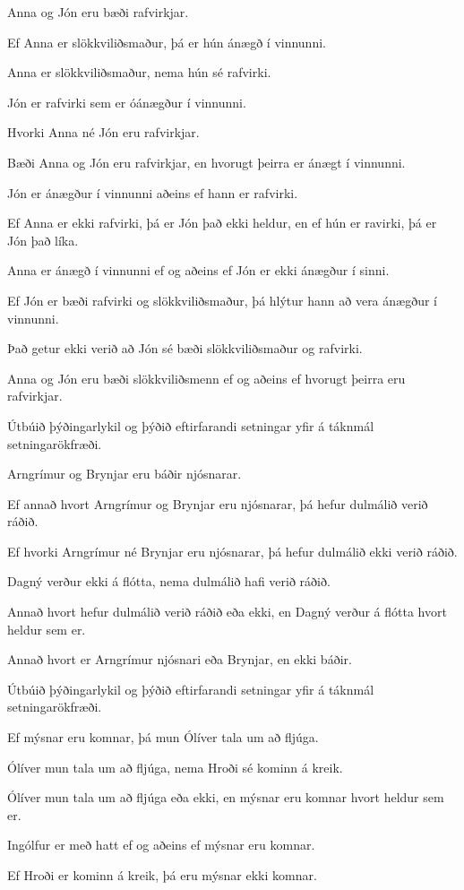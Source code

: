 \begin{earg}
\item Anna og Jón eru bæði rafvirkjar.
\item Ef Anna er slökkviliðsmaður, þá er hún ánægð í vinnunni.
\item Anna er slökkviliðsmaður, nema hún sé rafvirki.
\item Jón er rafvirki sem er óánægður í vinnunni.
\item Hvorki Anna né Jón eru rafvirkjar.
\item Bæði Anna og Jón eru rafvirkjar, en hvorugt þeirra er ánægt í vinnunni.
\item Jón er ánægður í vinnunni aðeins ef hann er rafvirki.
\item Ef Anna er ekki rafvirki, þá er Jón það ekki heldur, en ef hún er ravirki, þá er Jón það líka.
\item Anna er ánægð í vinnunni ef og aðeins ef Jón er ekki ánægður í sinni.
\item Ef Jón er bæði rafvirki og slökkviliðsmaður, þá hlýtur hann að vera ánægður í vinnunni.
\item Það getur ekki verið að Jón sé bæði slökkviliðsmaður og rafvirki.
\item Anna og Jón eru bæði slökkviliðsmenn ef og aðeins ef hvorugt þeirra eru rafvirkjar.
\end{earg}

\problempart
\label{pr.spies}
Útbúið þýðingarlykil og þýðið eftirfarandi setningar yfir á táknmál setningarökfræði.
\begin{earg}
\item Arngrímur og Brynjar eru báðir njósnarar.
\item Ef annað hvort Arngrímur og Brynjar eru njósnarar, þá hefur dulmálið verið ráðið.
\item Ef hvorki Arngrímur né Brynjar eru njósnarar, þá hefur dulmálið ekki verið ráðið.
\item Dagný verður ekki á flótta, nema dulmálið hafi verið ráðið.
\item Annað hvort hefur dulmálið verið ráðið eða ekki, en Dagný verður á flótta hvort heldur sem er.
\item Annað hvort er Arngrímur njósnari eða Brynjar, en ekki báðir.
\end{earg}

\problempart Útbúið þýðingarlykil og þýðið eftirfarandi setningar yfir á táknmál setningarökfræði.
\begin{earg}
\item Ef mýsnar eru komnar, þá mun Ólíver tala um að fljúga.
\item Ólíver mun tala um að fljúga, nema Hroði sé kominn á kreik.
\item Ólíver mun tala um að fljúga eða ekki, en mýsnar eru komnar hvort heldur sem er.
\item Ingólfur er með hatt ef og aðeins ef mýsnar eru komnar.
\item Ef Hroði er kominn á kreik, þá eru mýsnar ekki komnar.
\end{earg}

